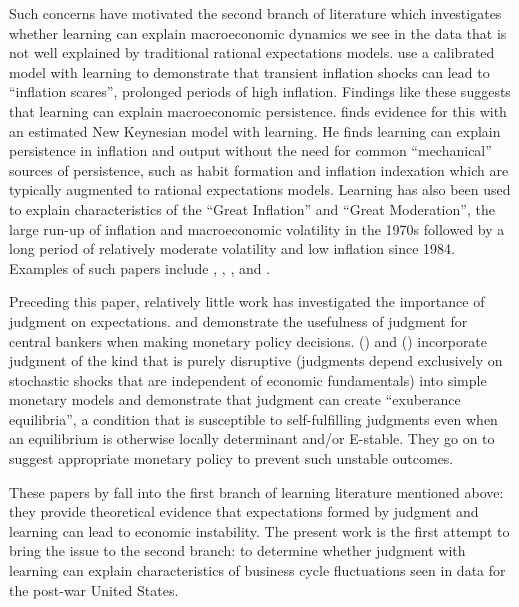 \documentclass[10pt]{article}
\newcommand{\citee}[1]{\citet{#1}}
\begin{document}
Such concerns have motivated the second branch of literature which investigates whether learning can explain macroeconomic dynamics we see in the data that is not well explained by traditional rational expectations models.  \citee{ow2005} use a calibrated model with learning to demonstrate that transient inflation shocks can lead to ``inflation scares'', prolonged periods of high inflation.  Findings like these suggests that learning can explain macroeconomic persistence.  \citee{milani2007} finds evidence for this with an estimated New Keynesian model with learning.  He finds learning can explain persistence in inflation and output without the need for common ``mechanical'' sources of persistence, such as habit formation and inflation indexation which are typically augmented to rational expectations models.  Learning has also been used to explain characteristics of the ``Great Inflation'' and ``Great Moderation'', the large run-up of inflation and macroeconomic volatility in the 1970s followed by a long period of relatively moderate volatility and low inflation since 1984.  Examples of such papers include \citee{ow2005b}, \citee{primiceri2006}, \citee{bullardeusepi2005}, and \citee{bullardsingh}.

Preceding this paper, relatively little work has investigated the importance of judgment on expectations.  \citee{rsw1997} and \citee{svensson2005} demonstrate the usefulness of judgment for central bankers when making monetary policy decisions.  \citeauthor*{beh2008} (\citeyear{beh2008}) and (\citeyear{beh2010}) incorporate judgment of the kind that is purely disruptive (judgments depend exclusively on stochastic shocks that are independent of economic fundamentals) into simple monetary models and demonstrate that judgment can create ``exuberance equilibria'', a condition that is susceptible to self-fulfilling judgments even when an equilibrium is otherwise locally determinant and/or E-stable.  They go on to suggest appropriate monetary policy to prevent such unstable outcomes.   

These papers by \citeauthor*{beh2008} fall into the first branch of learning literature mentioned above: they provide theoretical evidence that expectations formed by judgment and learning can lead to economic instability.  The present work is the first attempt to bring the issue to the second branch: to determine whether judgment with learning can explain characteristics of business cycle fluctuations seen in data for the post-war United States. 
\end{document}
